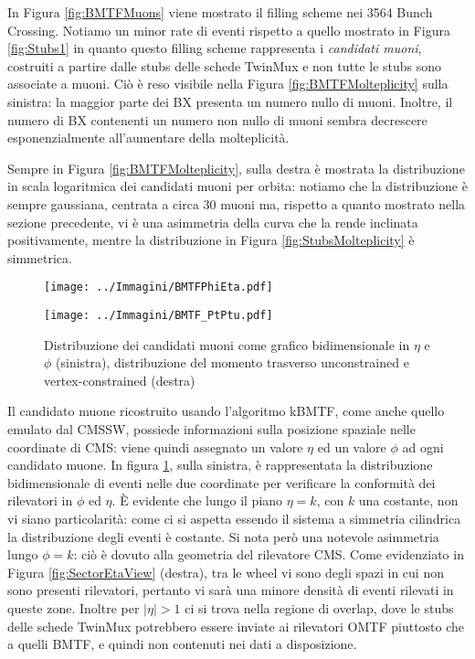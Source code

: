 In Figura \ref{fig:BMTFMuons} viene mostrato il filling scheme nei 3564 Bunch Crossing. Notiamo un minor rate di eventi rispetto a quello mostrato in Figura \ref{fig:Stubs1} in quanto questo filling scheme rappresenta i \textit{candidati muoni}, costruiti a partire dalle stubs delle schede TwinMux e non tutte le stubs sono associate a muoni. Ciò è reso visibile nella Figura \ref{fig:BMTFMolteplicity} sulla sinistra: la maggior parte dei BX presenta un numero nullo di muoni. Inoltre, il numero di BX contenenti un numero non nullo di muoni sembra decrescere esponenzialmente all’aumentare della molteplicità.

Sempre in Figura \ref{fig:BMTFMolteplicity}, sulla destra è mostrata la distribuzione in scala logaritmica dei candidati muoni per orbita: notiamo che la distribuzione è sempre gaussiana, centrata a circa 30 muoni ma, rispetto a quanto mostrato nella sezione precedente, vi è una asimmetria della curva che la rende inclinata positivamente, mentre la distribuzione in Figura \ref{fig:StubsMolteplicity} è simmetrica.

\begin{figure}[t]
  \centering
  \begin{minipage}[b]{0.51\textwidth}
    \centering
    \texttt{[image: ../Immagini/BMTFPhiEta.pdf]} 
    \end{minipage}
    \hfill 
    \begin{minipage}[b]{0.48\textwidth}
      \centering
      \texttt{[image: ../Immagini/BMTF\_PtPtu.pdf]} 
    \end{minipage}
    \caption{Distribuzione dei candidati muoni come grafico bidimensionale in $\eta$ e $\phi$ (sinistra), distribuzione del momento trasverso unconstrained e vertex-constrained (destra)}
  \label{fig:BMTFPt}
\end{figure}

Il candidato muone ricostruito usando l'algoritmo kBMTF, come anche quello emulato dal CMSSW, possiede informazioni sulla posizione spaziale nelle coordinate di CMS: viene quindi assegnato un valore $\eta$ ed un valore $\phi$ ad ogni candidato muone. In figura \ref{fig:BMTFPt}, sulla sinistra, è rappresentata la distribuzione bidimensionale di eventi nelle due coordinate per verificare la conformità dei rilevatori in $\phi$ ed $\eta$. È evidente che lungo il piano $\eta = k$, con $k$ una costante, non vi siano particolarità: come ci si aspetta essendo il sistema a simmetria cilindrica la distribuzione degli eventi è costante. Si nota però una notevole asimmetria lungo $\phi = k$: ciò è dovuto alla geometria del rilevatore CMS. Come evidenziato in Figura \ref{fig:SectorEtaView} (destra), tra le wheel vi sono degli spazi in cui non sono presenti rilevatori, pertanto vi sarà una minore densità di eventi rilevati in queste zone. Inoltre per $|\eta| > 1$ ci si trova nella regione di overlap, dove le stubs delle schede TwinMux potrebbero essere inviate ai rilevatori OMTF piuttosto che a quelli BMTF, e quindi non contenuti nei dati a disposizione.

